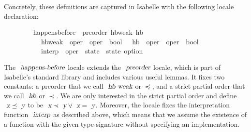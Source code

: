 Concretely, these definitions are captured in Isabelle with the following locale declaration:
\vspace{0.35em}
\begin{isabellebody}
\ \ \ \ \ \ \ \  happens{\isacharunderscore}before\ {\isacharequal}\ preorder\ hb{\isacharunderscore}weak\ hb\isanewline
\ \ \ \ \ \ \ \ \ \ \ hb{\isacharunderscore}weak\ {\isacharcolon}{\isacharcolon}\ {\isachardoublequoteopen}{\isacharprime}oper\ {\isasymRightarrow}\ {\isacharprime}oper\ {\isasymRightarrow}\ bool{\isachardoublequoteclose}\ \ \ hb\ {\isacharcolon}{\isacharcolon}\ {\isachardoublequoteopen}{\isacharprime}oper\ {\isasymRightarrow}\ {\isacharprime}oper\ {\isasymRightarrow}\ bool{\isachardoublequoteclose}\ {\isacharplus}\isanewline
\ \ \ \ \ \ \ \ \ \ \ interp\ {\isacharcolon}{\isacharcolon}\ {\isachardoublequoteopen}{\isacharprime}oper\ {\isasymRightarrow}\ {\isacharprime}state\ {\isasymRightarrow}\ {\isacharprime}state\ option{\isachardoublequoteclose}
\end{isabellebody}
\vspace{0.35em}
The $\isa{happens-before}$ locale extends the $\isa{preorder}$ locale, which is part of Isabelle's standard library and includes various useful lemmas.
It fixes two constants: a preorder that we call $\isa{hb-weak}$ or $\preceq$, and a strict partial order that we call $\isa{hb}$ or $\prec$.
We are only interested in the strict partial order and define $\isa{x}\preceq\isa{y}$ to be $\isa{x}\prec\isa{y} \vee \isa{x}=\isa{y}$.
Moreover, the locale fixes the interpretation function $\isa{interp}$ as described above, which means that we assume the existence of a function with the given type signature without specifying an implementation.

